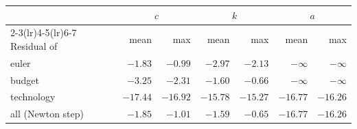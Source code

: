 \begin{tabular}{lrrrrrr}
\toprule
& \multicolumn{2}{c}{$c$} & \multicolumn{2}{c}{$k$} & \multicolumn{2}{c}{$a$} \\ \cmidrule(lr){2-3}\cmidrule(lr){4-5}\cmidrule(lr){6-7} Residual of & mean & max & mean & max & mean & max \\
\midrule
euler & $-1.83$ & $-0.99$ & $-2.97$ & $-2.13$ & $-\infty$ & $-\infty$ \\
budget & $-3.25$ & $-2.31$ & $-1.60$ & $-0.66$ & $-\infty$ & $-\infty$ \\
technology & $-17.44$ & $-16.92$ & $-15.78$ & $-15.27$ & $-16.77$ & $-16.26$ \\
all (Newton step) & $-1.85$ & $-1.01$ & $-1.59$ & $-0.65$ & $-16.77$ & $-16.26$ \\
\bottomrule
\end{tabular}
